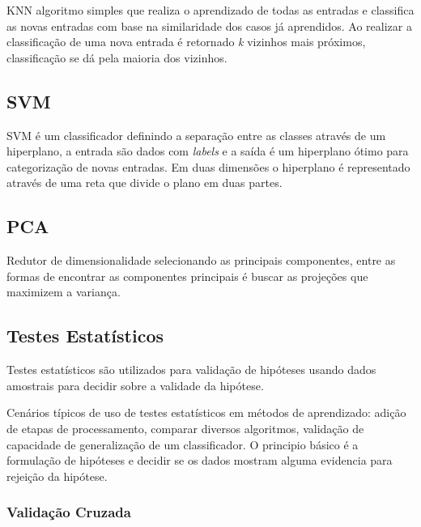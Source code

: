 \documentclass[12pt]{article}
\begin{document}
	KNN algoritmo simples que realiza o aprendizado de todas as entradas e classifica as novas entradas com base na similaridade dos casos já aprendidos. Ao realizar a classificação de uma nova entrada é retornado \emph{k} vizinhos mais próximos, classificação se dá pela maioria dos vizinhos.
	

\subsection{SVM}

	SVM é um classificador definindo a separação entre as classes através de um hiperplano, a entrada são dados com \emph{labels} e a saída é um hiperplano ótimo para categorização de novas entradas. Em duas dimensões o hiperplano é representado através de uma reta que divide o plano em duas partes.
	
\subsection{PCA}

	Redutor de dimensionalidade selecionando as principais componentes, entre as formas de encontrar as componentes principais é buscar as projeções que maximizem a variança.
	
\subsection{Testes Estatísticos}

	Testes estatísticos são utilizados para validação de hipóteses usando dados amostrais para decidir sobre a validade da hipótese.
	
	Cenários típicos de uso de testes estatísticos em métodos de aprendizado: adição de etapas de processamento, comparar diversos algoritmos, validação de capacidade de generalização de um classificador. O principio básico é a formulação de hipóteses e decidir se os dados mostram alguma evidencia para rejeição da hipótese.
	

	\subsubsection{Validação Cruzada}
	
\end{document}
